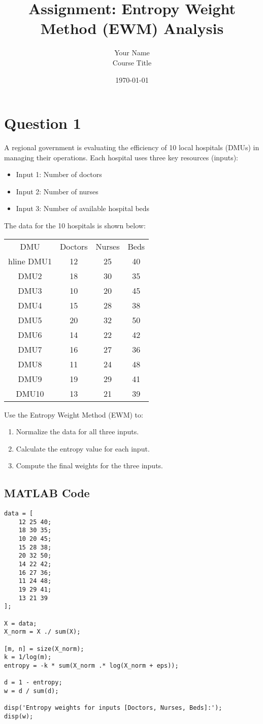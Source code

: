 \documentclass[12pt]{article}
\title{Assignment: Entropy Weight Method (EWM) Analysis}
\author{Your Name \\ Course Title}
\date{\today}
\begin{document}
\maketitle

\section*{Question 1}
A regional government is evaluating the efficiency of 10 local hospitals (DMUs) in managing their operations. Each hospital uses three key resources (inputs):
\begin{itemize}
  \item Input 1: Number of doctors
  \item Input 2: Number of nurses
  \item Input 3: Number of available hospital beds
\end{itemize}
The data for the 10 hospitals is shown below:
\begin{center}
\begin{tabular}{c|ccc}
DMU & Doctors & Nurses & Beds \\hline
DMU1  & 12 & 25 & 40 \\
DMU2  & 18 & 30 & 35 \\
DMU3  & 10 & 20 & 45 \\
DMU4  & 15 & 28 & 38 \\
DMU5  & 20 & 32 & 50 \\
DMU6  & 14 & 22 & 42 \\
DMU7  & 16 & 27 & 36 \\
DMU8  & 11 & 24 & 48 \\
DMU9  & 19 & 29 & 41 \\
DMU10 & 13 & 21 & 39 \\
\end{tabular}
\end{center}
Use the Entropy Weight Method (EWM) to:
\begin{enumerate}
  \item Normalize the data for all three inputs.
  \item Calculate the entropy value for each input.
  \item Compute the final weights for the three inputs.
\end{enumerate}

\subsection*{MATLAB Code}
\begin{lstlisting}
data = [
    12 25 40;
    18 30 35;
    10 20 45;
    15 28 38;
    20 32 50;
    14 22 42;
    16 27 36;
    11 24 48;
    19 29 41;
    13 21 39
];

X = data;
X_norm = X ./ sum(X);

[m, n] = size(X_norm);
k = 1/log(m);
entropy = -k * sum(X_norm .* log(X_norm + eps));

d = 1 - entropy;
w = d / sum(d);

disp('Entropy weights for inputs [Doctors, Nurses, Beds]:');
disp(w);
\end{lstlisting}
\end{document}
